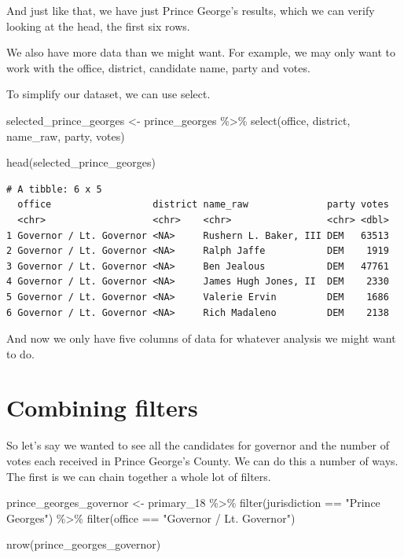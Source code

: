 \documentclass[
  letterpaper,
  DIV=11,
  numbers=noendperiod]{scrreprt}
\newenvironment{Shaded}{\begin{snugshade}}{\end{snugshade}}
\newcommand{\FunctionTok}[1]{\textcolor[rgb]{0.28,0.35,0.67}{#1}}
\newcommand{\NormalTok}[1]{\textcolor[rgb]{0.00,0.23,0.31}{#1}}
\newcommand{\OtherTok}[1]{\textcolor[rgb]{0.00,0.23,0.31}{#1}}
\newcommand{\SpecialCharTok}[1]{\textcolor[rgb]{0.37,0.37,0.37}{#1}}
\newcommand{\StringTok}[1]{\textcolor[rgb]{0.13,0.47,0.30}{#1}}
\begin{document}
And just like that, we have just Prince George's results, which we can
verify looking at the head, the first six rows.

We also have more data than we might want. For example, we may only want
to work with the office, district, candidate name, party and votes.

To simplify our dataset, we can use select.

\begin{Shaded}
\begin{Highlighting}[]
\NormalTok{selected\_prince\_georges }\OtherTok{\textless{}{-}}\NormalTok{ prince\_georges }\SpecialCharTok{\%\textgreater{}\%} \FunctionTok{select}\NormalTok{(office, district, name\_raw, party, votes)}

\FunctionTok{head}\NormalTok{(selected\_prince\_georges)}
\end{Highlighting}
\end{Shaded}

\begin{verbatim}
# A tibble: 6 x 5
  office                  district name_raw              party votes
  <chr>                   <chr>    <chr>                 <chr> <dbl>
1 Governor / Lt. Governor <NA>     Rushern L. Baker, III DEM   63513
2 Governor / Lt. Governor <NA>     Ralph Jaffe           DEM    1919
3 Governor / Lt. Governor <NA>     Ben Jealous           DEM   47761
4 Governor / Lt. Governor <NA>     James Hugh Jones, II  DEM    2330
5 Governor / Lt. Governor <NA>     Valerie Ervin         DEM    1686
6 Governor / Lt. Governor <NA>     Rich Madaleno         DEM    2138
\end{verbatim}

And now we only have five columns of data for whatever analysis we might
want to do.

\hypertarget{combining-filters}{%
\section{Combining filters}\label{combining-filters}}

So let's say we wanted to see all the candidates for governor and the
number of votes each received in Prince George's County. We can do this
a number of ways. The first is we can chain together a whole lot of
filters.

\begin{Shaded}
\begin{Highlighting}[]
\NormalTok{prince\_georges\_governor }\OtherTok{\textless{}{-}}\NormalTok{ primary\_18 }\SpecialCharTok{\%\textgreater{}\%} \FunctionTok{filter}\NormalTok{(jurisdiction }\SpecialCharTok{==} \StringTok{"Prince George\textquotesingle{}s"}\NormalTok{) }\SpecialCharTok{\%\textgreater{}\%} \FunctionTok{filter}\NormalTok{(office }\SpecialCharTok{==} \StringTok{"Governor / Lt. Governor"}\NormalTok{)}

\FunctionTok{nrow}\NormalTok{(prince\_georges\_governor)}
\end{Highlighting}
\end{Shaded}
\end{document}
